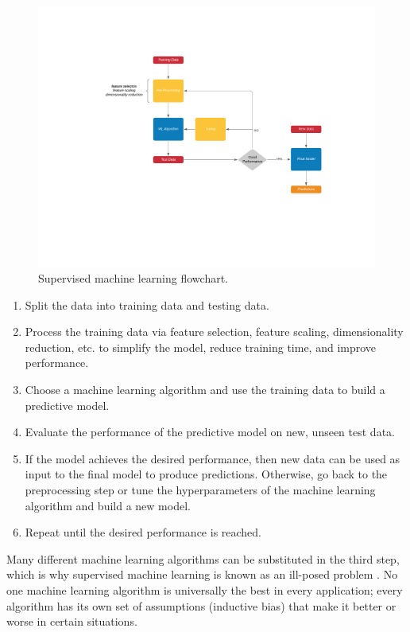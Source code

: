 \documentclass[pageno]{jpaper}
\begin{document}
\begin{figure}[hbt]
\centering
\includegraphics[width=\linewidth]{mlflow.png}
\caption{Supervised machine learning flowchart.}
\label{fig:mlflow}
\end{figure}

\begin{enumerate}
    \item Split the data into training data and testing data.
    \item Process the training data via feature selection, feature scaling, dimensionality reduction, etc. to simplify the model, reduce training time, and improve performance.
    \item Choose a machine learning algorithm and use the training data to build a predictive model.
    \item Evaluate the performance of the predictive model on new, unseen test data.
    \item If the model achieves the desired performance, then new data can be used as input to the final model to produce predictions. Otherwise, go back to the preprocessing step or tune the hyperparameters of the machine learning algorithm and build a new model.
    \item Repeat until the desired performance is reached.
\end{enumerate}

Many different machine learning algorithms can be substituted in the third step, which is why supervised machine learning is known as an ill-posed problem \cite{mitfundamentals}. No one machine learning algorithm is universally the best in every application; every algorithm has its own set of assumptions (inductive bias) that make it better or worse in certain situations.
\end{document}
